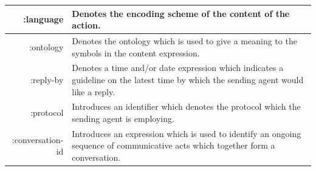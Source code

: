 \documentclass[main.tex]{subfiles}
\begin{document}
\begin{table}[htbp]
\begin{tabularx}{.8\textwidth}{>{\ttfamily}rX}
        :language                                                          & Denotes the encoding scheme of the content of the
                                                                            action. \\\midrule
        :ontology                                                          & Denotes the ontology which is used to give a
                                                                            meaning to the symbols in the content expression. \\\midrule
        :reply-by                                                          & Denotes a time and/or date expression which
                                                                            indicates a guideline on the latest time by which the
                                                                            sending agent would like a reply. \\\midrule
        :protocol                                                          & Introduces an identifier which denotes the protocol
                                                                            which the sending agent is employing. \\\midrule
        :conversation-id                                                   & Introduces an expression which is used to identify an
                                                                            ongoing sequence of communicative acts which
                                                                            together form a conversation. \\\bottomrule
    \end{tabularx}
    \label{message-parameters}
\end{table}
\clearpage
\end{document}
